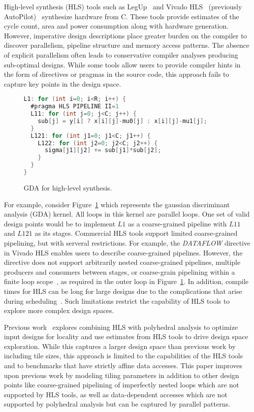 High-level synthesis (HLS) tools such as LegUp~\cite{legup-tecs} and Vivado HLS~\cite{vivadohls} (previously AutoPilot)~\cite{cong11hls}
synthesize hardware from C. These tools provide estimates of the cycle count, area and power consumption
along with hardware generation. However, imperative design descriptions place greater burden on
the compiler to discover parallelism, pipeline structure and memory access patterns.
The absence of explicit parallelism often leads to conservative compiler analyses
producing sub-optimal designs. While some tools allow users to provide compiler
hints in the form of directives or pragmas in the source code, this approach
fails to capture key points in the design space.
\begin{figure}[ht]
\begin{lstlisting}[mathescape=true, numbers=none, language=C]
L1: for (int i=0; i<R; i++) {
  #pragma HLS PIPELINE II=1
  L11: for (int j=0; j<C; j++) {
    sub[j] = y[i] ? x[i][j]-mu0[j] : x[i][j]-mu1[j];
  }
  L121: for (int j1=0; j1<C; j1++) {
    L122: for (int j2=0; j2<C; j2++) {
      sigma[j1][j2] += sub[j1]*sub[j2];
    }
  }
}
\end{lstlisting}
\caption{GDA for high-level synthesis.}
\label{fig:gda-hls}
\end{figure}
For example, consider Figure~\ref{fig:gda-hls} which represents the gaussian discriminant analysis (GDA)
kernel. All loops in this kernel are parallel loops. One set of valid design points would be to implement $L1$
as a coarse-grained pipeline with $L11$ and $L121$ as its stages. Commercial HLS tools support
 limited coarse-grained pipelining, but with serveral restrictions. For example,
the \emph{DATAFLOW} directive in Vivado HLS enables users to describe coarse-grained pipelines.
However, the directive does not support arbitrarily nested coarse-grained pipelines,
multiple producers and consumers between stages, or coarse-grain pipelining within a finite loop scope~\cite{vivadohls_ug}, as required in the outer loop in Figure~\ref{fig:gda-hls}.
In addition, compile times for HLS can be long for large designs due to the complications that
arise during scheduling~\cite{Aladdin}.
Such limitations restrict the capability of HLS tools to explore more complex design spaces.

Previous work~\cite{pouchet13fpga}
explores combining HLS with polyhedral analysis to optimize input designs for locality
and use estimates from HLS tools to drive design space exploration. While this captures a larger design
space than previous work by including tile sizes, this approach is limited to the capabilities
of the HLS tools and to benchmarks that have strictly affine data accesses. This paper improves
upon previous work by modeling tiling
parameters in addition to other design points like coarse-grained pipelining of imperfectly nested loops
which are not supported by HLS tools, as well as data-dependent accesses which are not supported by polyhedral analysis but can be captured by parallel patterns.

